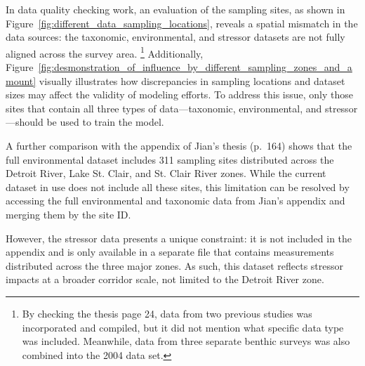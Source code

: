 In data quality checking work, an evaluation of the sampling sites, as shown in Figure~\ref{fig:different_data_sampling_locations},
reveals a spatial mismatch in the data sources: the taxonomic, environmental, and stressor datasets are not
fully aligned across the survey area. 
\footnote{By checking the thesis page 24, data from two previous studies was incorporated and compiled, but
it did not mention what specific data type was included. Meanwhile, data from three separate benthic surveys
was also combined into the 2004 data set.}
Additionally, Figure~\ref{fig:desmonstration_of_influence_by_different_sampling_zones_and_amount}
visually illustrates how discrepancies in sampling locations and dataset sizes may affect the validity of modeling efforts. 
To address this issue, only those sites that contain all three types of data—taxonomic, environmental,
and stressor—should be used to train the model.

A further comparison with the appendix of Jian’s thesis (p.~164) shows that the
full environmental dataset includes 311 sampling sites distributed across the Detroit River, 
Lake St. Clair, and St. Clair River zones. While the current dataset in use does not include all 
these sites, this limitation can be resolved by accessing the full environmental and 
taxonomic data from Jian’s appendix and merging them by the site ID.

However, the stressor data presents a unique constraint: it is not included in the appendix 
and is only available in a separate file that contains measurements distributed across the three major zones. 
As such, this dataset reflects stressor impacts at a broader corridor scale, not limited to the Detroit River zone. 


